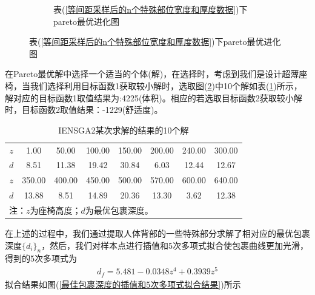 \begin{figure}[H]
\begin{subfigure}[b]{0.4\textwidth}
            \caption{表(\ref{等间距采样后的n个特殊部位宽度和厚度数据})下pareto最优进化图}
            \label{表5下pareto最优进化图}
                    \end{subfigure}
                \end{figure}

            \par
            在Pareto最优解中选择一个适当的个体(解)，在选择时，考虑到我们是设计超薄座椅，当我们选择利用目标函数1获取较小解时，选取图(\ref{表5下pareto最优进化图})中10个解如表(\ref{IENSGA2某次求解的结果的10个解})所示，解对应的目标函数1取值结果为:4225(体积)。相应的若选取目标函数2获取较小解时，目标函数2取值结果：-1229(舒适度)。

        \begin{table}[H]
        \centering
        \caption{IENSGA2某次求解的结果的10个解}
        \label{IENSGA2某次求解的结果的10个解}
        \begin{tabular}{cccccccc}
        \toprule
        $z$  & 1.00   & 50.00 &  100.00 & 150.00 & 200.00 & 240.00 & 300.00\\
        $d$  & 8.51   & 11.38 &  19.42  & 30.84  & 6.03   & 12.44  & 12.67 \\
        \hline
        \hline
        $z$  & 350.00 & 400.00&  450.00 & 500.00 & 570.00 & 600.00 & 640.00\\
        $d$  & 13.88  & 8.51  &  14.89  & 20.36  & 13.30  & 3.62   & 12.38 \\
        \bottomrule
        \multicolumn{8}{l}{\footnotesize 注：$z$为座椅高度；$d$为最优包裹深度。}\\
        \end{tabular}
        \end{table}
            \par
            在上述的过程中，我们通过提取人体背部的一些特殊部分求解了相对应的最优包裹深度$\{d_i \}_n$，然后，我们对样本点进行插值和5次多项式拟合使包裹曲线更加光滑，得到的5次多项式为
            \begin{align*}
            d_f = 5.481-0.0348z^4+0.3939z^5
            \end{align*}
            拟合结果如图(\ref{最佳包裹深度的插值和5次多项式拟合结果})所示
